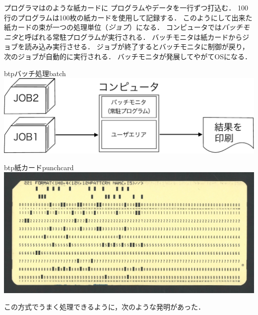 プログラマはのような紙カードに
プログラムやデータを一行ずつ打込む．
100行のプログラムは100枚の紙カードを使用して記録する．
このようにして出来た紙カードの束が一つの処理単位（\emph{ジョブ}）になる．
コンピュータでは\emph{バッチモニタ}と呼ばれる常駐プログラムが実行される．
バッチモニタは紙カードからジョブを読み込み実行させる．
ジョブが終了するとバッチモニタに制御が戻り，
次のジョブが自動的に実行される．
バッチモニタが発展してやがてOSになる．

\begin{myfig}{btp}{バッチ処理}{batch}
  \includegraphics[scale=0.60]{Fig/batch-crop.pdf}
\end{myfig}

\begin{myfig}{btp}{紙カード}{punchcard}
  \includegraphics[scale=0.3]{Photo/punchcard.jpg}
\end{myfig}

この方式でうまく処理できるように，次のような発明があった．

